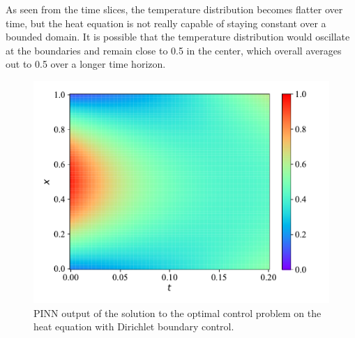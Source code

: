 As seen from the time slices, the temperature distribution becomes flatter over time, but the heat equation is not really capable of staying constant over a bounded domain. It is possible that the temperature distribution would oscillate at the boundaries and remain close to 0.5 in the center, which overall averages out to 0.5 over a longer time horizon.

\begin{figure}[H]
    \centering
    \includegraphics[width=1.0\linewidth]{Figures/IntermediateExperiments/OptimalControl/heat1d_optimal_control_boundary2.pdf}
    \caption{PINN output of the solution to the optimal control problem on the heat equation with Dirichlet boundary control.}
    \label{fig:heat1d_optimal_control_boundary2}
\end{figure}


